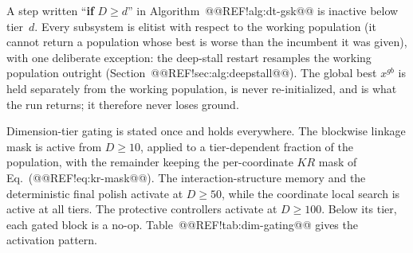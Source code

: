 \documentclass[10pt,a4paper]{article}
\begin{document}
A step written ``\textbf{if} $D\ge d$'' in Algorithm~@@REF!alg:dt-gsk@@ is
inactive below tier~$d$. Every subsystem is elitist with respect to the
working population (it cannot return a population whose best is worse
than the incumbent it was given), with one deliberate exception: the
deep-stall restart resamples the working population outright
(Section~@@REF!sec:alg:deepstall@@). The global best $x^{gb}$ is held
separately from the working population, is never re-initialized, and is
what the run returns; it therefore never loses ground.

Dimension-tier gating is stated once and holds everywhere.
The blockwise linkage mask is active from $D\ge10$, applied to a
tier-dependent fraction of the population, with the remainder keeping
the per-coordinate $KR$ mask of Eq.~(@@REF!eq:kr-mask@@).
The interaction-structure memory and the
deterministic final polish activate at $D\ge50$, while the coordinate local search
is active at all tiers. The protective
controllers activate at $D\ge100$. 
Below its tier, each gated block is a no-op.
Table~@@REF!tab:dim-gating@@ gives the activation pattern.
\end{document}
